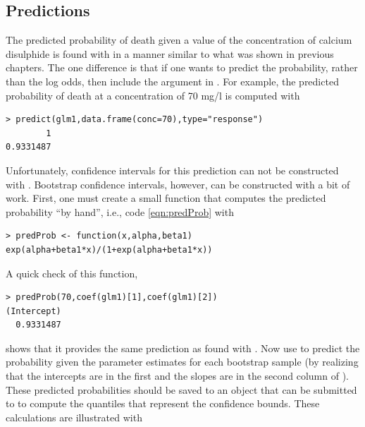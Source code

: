 \documentclass[10pt,openany]{book}\usepackage[]{graphicx}\usepackage[]{color}
\makeatletter
\newenvironment{kframe}{%
 \def\at@end@of@kframe{}%
 \ifinner\ifhmode%
  \def\at@end@of@kframe{\end{minipage}}%
  \begin{minipage}{\columnwidth}%
 \fi\fi%
 \def\FrameCommand##1{\hskip\@totalleftmargin \hskip-\fboxsep
 \colorbox{shadecolor}{##1}\hskip-\fboxsep
     \hskip-\linewidth \hskip-\@totalleftmargin \hskip\columnwidth}%
 \MakeFramed {\advance\hsize-\width
   \@totalleftmargin\z@ \linewidth\hsize
   \@setminipage}}%
 {\par\unskip\endMakeFramed%
 \at@end@of@kframe}
\newenvironment{knitrout}{}{} %
\makeatother
\begin{document}
\subsection{Predictions}
The predicted probability of death given a value of the concentration of calcium disulphide is found with  in a manner similar to what was shown in previous chapters.  The one difference is that if one wants to predict the probability, rather than the log odds, then include the  argument in .  For example, the predicted probability of death at a concentration of 70 mg/l is computed with
\begin{knitrout}
\color{fgcolor}\begin{kframe}
\begin{verbatim}
> predict(glm1,data.frame(conc=70),type="response")
        1 
0.9331487 
\end{verbatim}
\end{kframe}
\end{knitrout}
Unfortunately, confidence intervals for this prediction can not be constructed with .  Bootstrap confidence intervals, however, can be constructed with a bit of work.  First, one must create a small function that computes the predicted probability ``by hand'', i.e., code \eqref{eqn:predProb} with
\begin{knitrout}
\color{fgcolor}\begin{kframe}
\begin{verbatim}
> predProb <- function(x,alpha,beta1) exp(alpha+beta1*x)/(1+exp(alpha+beta1*x))
\end{verbatim}
\end{kframe}
\end{knitrout}
A quick check of this function,
\begin{knitrout}
\color{fgcolor}\begin{kframe}
\begin{verbatim}
> predProb(70,coef(glm1)[1],coef(glm1)[2])
(Intercept) 
  0.9331487 
\end{verbatim}
\end{kframe}
\end{knitrout}
shows that it provides the same prediction as found with .  Now use  to predict the probability given the parameter estimates for each bootstrap sample (by realizing that the intercepts are in the first and the slopes are in the second column of ).  These predicted probabilities should be saved to an object that can be submitted to  to compute the quantiles that represent the confidence bounds.  These calculations are illustrated with
\end{document}
